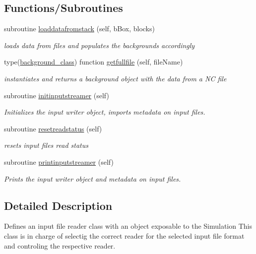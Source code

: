 \subsection*{Functions/\+Subroutines}
\begin{DoxyCompactItemize}
\item 
subroutine \mbox{\hyperlink{namespacesimulationinputstreamer__mod_a3d4540f8e04cc0215895cad65c5be952}{loaddatafromstack}} (self, b\+Box, blocks)
\begin{DoxyCompactList}\small\item\em loads data from files and populates the backgrounds accordingly \end{DoxyCompactList}\item 
type(\mbox{\hyperlink{structbackground__mod_1_1background__class}{background\+\_\+class}}) function \mbox{\hyperlink{namespacesimulationinputstreamer__mod_a532b4022fdb6db20d41ca8082d4e7423}{getfullfile}} (self, file\+Name)
\begin{DoxyCompactList}\small\item\em instantiates and returns a background object with the data from a NC file \end{DoxyCompactList}\item 
subroutine \mbox{\hyperlink{namespacesimulationinputstreamer__mod_a0e5a1e43fe53f179325858d486a284e5}{initinputstreamer}} (self)
\begin{DoxyCompactList}\small\item\em Initializes the input writer object, imports metadata on input files. \end{DoxyCompactList}\item 
subroutine \mbox{\hyperlink{namespacesimulationinputstreamer__mod_a9465e29f527366e5f6d9a1195de6ddee}{resetreadstatus}} (self)
\begin{DoxyCompactList}\small\item\em resets input files read status \end{DoxyCompactList}\item 
subroutine \mbox{\hyperlink{namespacesimulationinputstreamer__mod_a1b906bc5ba1fac8d846b30237216aca4}{printinputstreamer}} (self)
\begin{DoxyCompactList}\small\item\em Prints the input writer object and metadata on input files. \end{DoxyCompactList}\end{DoxyCompactItemize}


\subsection{Detailed Description}
Defines an input file reader class with an object exposable to the Simulation This class is in charge of selectig the correct reader for the selected input file format and controling the respective reader. 

